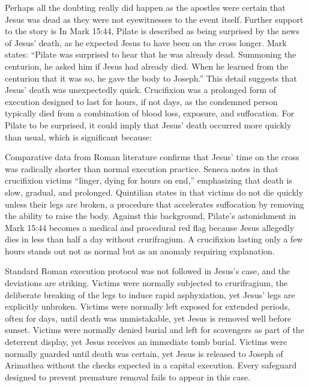 Perhaps all the doubting really did happen as the apostles were certain that Jesus was dead as they were not eyewitnesses to the event itself.
Further support to the story is In Mark 15:44, Pilate is described as being surprised by the news of Jesus' death, as he expected Jesus to have been on the cross longer.
Mark states: ``Pilate was surprised to hear that he was already dead.
Summoning the centurion, he asked him if Jesus had already died.
When he learned from the centurion that it was so, he gave the body to Joseph.'' This detail suggests that Jesus' death was unexpectedly quick.
Crucifixion was a prolonged form of execution designed to last for hours, if not days, as the condemned person typically died from a combination of blood loss, exposure, and suffocation.
For Pilate to be surprised, it could imply that Jesus' death occurred more quickly than usual, which is significant because:

Comparative data from Roman literature confirms that Jesus' time on the cross was radically shorter than normal execution practice.
Seneca notes in \cite[101.14]{seneca:epistles} that crucifixion victims ``linger, dying for hours on end,'' emphasizing that death is slow, gradual, and prolonged.
Quintilian states in \cite[274]{quintilian:declamation} that victims do not die quickly unless their legs are broken, a procedure that accelerates suffocation by removing the ability to raise the body.
Against this background, Pilate's astonishment in Mark 15:44 becomes a medical and procedural red flag because Jesus allegedly dies in less than half a day without crurifragium.
A crucifixion lasting only a few hours stands out not as normal but as an anomaly requiring explanation.

Standard Roman execution protocol was not followed in Jesus's case, and the deviations are striking.
Victims were normally subjected to crurifragium, the deliberate breaking of the legs to induce rapid asphyxiation, yet Jesus' legs are explicitly unbroken.
Victims were normally left exposed for extended periods, often for days, until death was unmistakable, yet Jesus is removed well before sunset.
Victims were normally denied burial and left for scavengers as part of the deterrent display, yet Jesus receives an immediate tomb burial.
Victims were normally guarded until death was certain, yet Jesus is released to Joseph of Arimathea without the checks expected in a capital execution.
Every safeguard designed to prevent premature removal fails to appear in this case.

